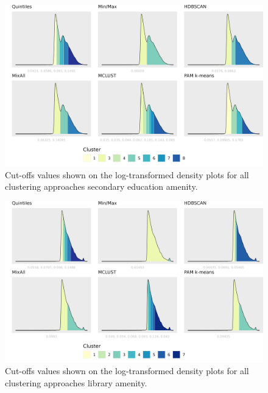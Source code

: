 \documentclass[11pt, a4paper]{article}
\begin{document}
\begin{figure}[H]
\centering
\includegraphics[width=\textwidth]{./cutoffs/by_amenity/Secondary Education_cutoffs.png}
\caption[Secondary education cutoffs]{Cut-offs values shown on the log-transformed density plots for all clustering approaches secondary education amenity.}\label{seceduccutoffs}
\end{figure}










\begin{figure}[H]
\centering
\includegraphics[width=\textwidth]{./cutoffs/by_amenity/Library_cutoffs.png}
\caption[Library cutoffs]{Cut-offs values shown on the log-transformed density plots for all clustering approaches library amenity.}\label{librarycutoffs}
\end{figure}
\end{document}
